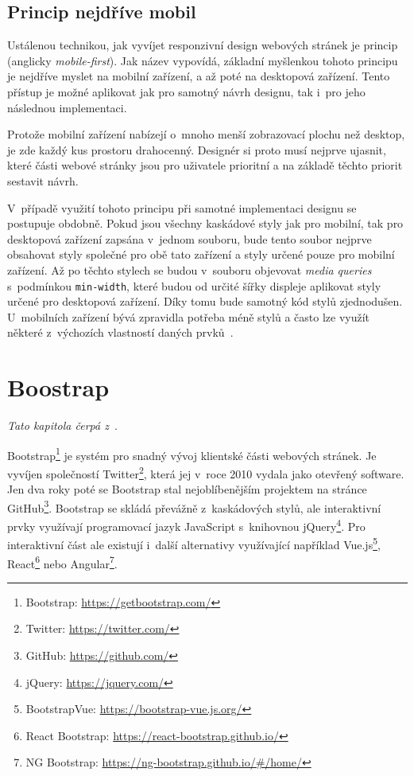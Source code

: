 \subsection{Princip nejdříve mobil}\label{section:mobile-first}
Ustálenou technikou, jak vyvíjet responzivní design webových stránek je princip  (anglicky \emph{mobile-first}). Jak název vypovídá, základní myšlenkou tohoto principu je nejdříve myslet na mobilní zařízení, a až poté na desktopová zařízení. Tento přístup je možné aplikovat jak pro samotný návrh designu, tak i~pro jeho následnou implementaci.

Protože mobilní zařízení nabízejí o~mnoho menší zobrazovací plochu než desktop, je zde každý kus prostoru drahocenný. Designér si proto musí nejprve ujasnit, které části webové stránky jsou pro uživatele prioritní a na základě těchto priorit sestavit návrh.

V~případě využití tohoto principu při samotné implementaci designu se postupuje obdobně. Pokud jsou všechny kaskádové styly jak pro mobilní, tak pro desktopová zařízení zapsána v~jednom souboru, bude tento soubor nejprve obsahovat styly společné pro obě tato zařízení a styly určené pouze pro mobilní zařízení. Až po těchto stylech se budou v~souboru objevovat \emph{media queries} s~podmínkou \texttt{min-width}, které budou od určité šířky displeje aplikovat styly určené pro desktopová zařízení. Díky tomu bude samotný kód stylů zjednodušen. U~mobilních zařízení bývá zpravidla potřeba méně stylů a často lze využít některé z~výchozích vlastností daných prvků~\cite{bib:mobile-first}.


\section{Boostrap}
\emph{Tato kapitola čerpá z~\cite{bib:bootstrap}}.

Bootstrap\footnote{Bootstrap: \url{https://getbootstrap.com/}} je systém pro snadný vývoj klientské části webových stránek. Je vyvíjen společností Twitter\footnote{Twitter: \url{https://twitter.com/}}, která jej v~roce 2010 vydala jako otevřený software. Jen dva roky poté se Bootstrap stal nejoblíbenějším projektem na stránce GitHub\footnote{GitHub: \url{https://github.com/}}. Bootstrap se skládá převážně z~kaskádových stylů, ale interaktivní prvky využívají programovací jazyk JavaScript s~knihovnou jQuery\footnote{jQuery: \url{https://jquery.com/}}. Pro interaktivní část ale existují i~další alternativy využívající například Vue.js\footnote{BootstrapVue: \url{https://bootstrap-vue.js.org/}}, React\footnote{React Bootstrap: \url{https://react-bootstrap.github.io/}} nebo Angular\footnote{NG Bootstrap: \url{https://ng-bootstrap.github.io/\#/home/}}.

